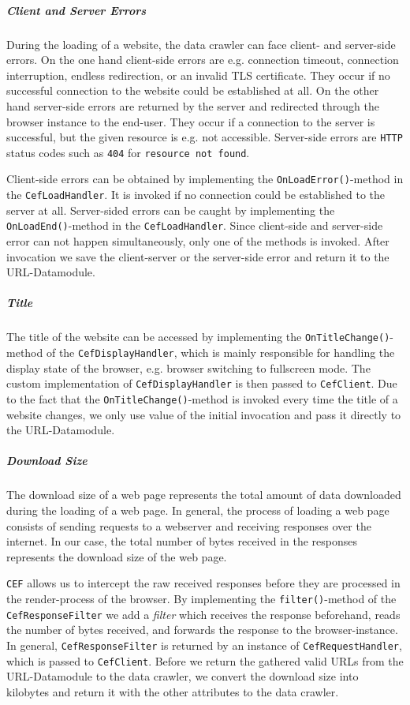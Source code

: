 \subparagraph*{Client and Server Errors}
During the loading of a website, the data crawler can face client- and server-side errors. On the one hand client-side errors are e.g. connection timeout, connection interruption, endless redirection, or an invalid TLS certificate. They occur if no successful connection to the website could be established at all. On the other hand server-side errors are returned by the server and redirected through the browser instance to the end-user. They occur if a connection to the server is successful, but the given resource is e.g. not accessible. Server-side errors are \texttt{HTTP} status codes such as \texttt{404} for \texttt{resource not found}. 

Client-side errors can be obtained by implementing the \texttt{OnLoadError()}-method in the \texttt{CefLoadHandler}. It is invoked if no connection could be established to the server at all. Server-sided errors can be caught by implementing the \texttt{OnLoadEnd()}-method in the \texttt{CefLoadHandler}. Since client-side and server-side error can not happen simultaneously, only one of the methods is invoked. After invocation we save the client-server or the server-side error and return it to the URL-Datamodule.

\subparagraph*{Title}
The title of the website can be accessed by implementing the \texttt{OnTitleChange()}-method of the \texttt{CefDisplayHandler}, which is mainly responsible for handling the display state of the browser, e.g. browser switching to fullscreen mode. The custom implementation of \texttt{CefDisplayHandler} is then passed to \texttt{CefClient}. Due to the fact that the \texttt{OnTitleChange()}-method is invoked every time the title of a website changes, we only use value of the initial invocation and pass it directly to the URL-Datamodule.

\subparagraph*{Download Size}
The download size of a web page represents the total amount of data downloaded during the loading of a web page. In general, the process of loading a web page consists of sending requests to a webserver and receiving responses over the internet. In our case, the total number of bytes received in the responses represents the download size of the web page.

\texttt{CEF} allows us to intercept the raw received responses before they are processed in the render-process of the browser. By implementing the \texttt{filter()}-method of the \texttt{CefResponseFilter} we add a \textit{filter} which receives the response beforehand, reads the number of bytes received, and forwards the response to the browser-instance. In general, \texttt{CefResponseFilter} is returned by an instance of \texttt{CefRequestHandler}, which is passed to \texttt{CefClient}. Before we return the gathered valid URLs from the URL-Datamodule to the data crawler, we convert the download size into kilobytes and return it with the other attributes to the data crawler.

